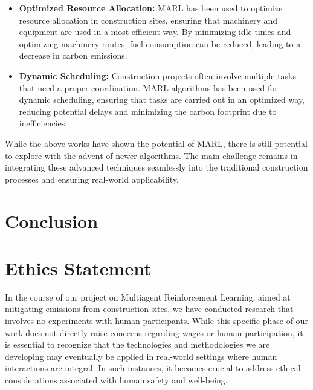 \documentclass[conference]{IEEEtran}
\begin{document}
	\begin{itemize}

		\item \textbf{Optimized Resource Allocation:}
			MARL has been used to optimize resource allocation in construction sites, ensuring that machinery and equipment are used in a most efficient way. By minimizing idle times and optimizing machinery routes, fuel consumption can be reduced, leading to a decrease in carbon emissions\cite{resource_allocation}.

		\item \textbf{Dynamic Scheduling:}
			Construction projects often involve multiple tasks that need a proper coordination. MARL algorithms has been used for dynamic scheduling, ensuring that tasks are carried out in an optimized way, reducing potential delays and minimizing the carbon footprint due to inefficiencies\cite{dynamic_scheduling}.

	\end{itemize}

	While the above works have shown the potential of MARL, there is still potential to explore with the advent of newer algorithms. The main challenge remains in integrating these advanced techniques seamlessly into the traditional construction processes and ensuring real-world applicability.

	\noindent


	\section{Conclusion}




	\newpage
	
	


\newpage

\appendices 
\section{Ethics Statement}
In the course of our project on Multiagent Reinforcement Learning, aimed at mitigating \coo emissions
from construction sites, we have conducted research that involves no experiments with human participants.
While this specific phase of our work does not directly raise concerns regarding wages or human
participation, it is essential to recognize that the technologies and methodologies we are developing
may eventually be applied in real-world settings where human interactions are integral. In such instances,
it becomes crucial to address ethical considerations associated with human safety and well-being.
\end{document}
